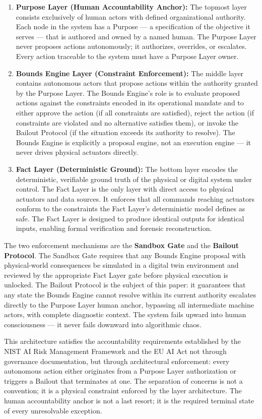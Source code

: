 \begin{enumerate}

\item \textbf{Purpose Layer (Human Accountability Anchor):} The topmost layer consists exclusively of human actors with defined organizational authority. Each node in the system has a Purpose --- a specification of the objective it serves --- that is authored and owned by a named human. The Purpose Layer never proposes actions autonomously; it authorizes, overrides, or escalates. Every action traceable to the system must have a Purpose Layer owner.

\item \textbf{Bounds Engine Layer (Constraint Enforcement):} The middle layer contains autonomous actors that propose actions within the authority granted by the Purpose Layer. The Bounds Engine's role is to evaluate proposed actions against the constraints encoded in its operational mandate and to either approve the action (if all constraints are satisfied), reject the action (if constraints are violated and no alternative satisfies them), or invoke the Bailout Protocol (if the situation exceeds its authority to resolve). The Bounds Engine is explicitly a proposal engine, not an execution engine --- it never drives physical actuators directly.

\item \textbf{Fact Layer (Deterministic Ground):} The bottom layer encodes the deterministic, verifiable ground truth of the physical or digital system under control. The Fact Layer is the only layer with direct access to physical actuators and data sources. It enforces that all commands reaching actuators conform to the constraints the Fact Layer's deterministic model defines as safe. The Fact Layer is designed to produce identical outputs for identical inputs, enabling formal verification and forensic reconstruction.

\end{enumerate}

The two enforcement mechanisms are the \textbf{Sandbox Gate} and the \textbf{Bailout Protocol}. The Sandbox Gate requires that any Bounds Engine proposal with physical-world consequences be simulated in a digital twin environment and reviewed by the appropriate Fact Layer gate before physical execution is unlocked. The Bailout Protocol is the subject of this paper: it guarantees that any state the Bounds Engine cannot resolve within its current authority escalates directly to the Purpose Layer human anchor, bypassing all intermediate machine actors, with complete diagnostic context. The system fails upward into human consciousness --- it never fails downward into algorithmic chaos.

This architecture satisfies the accountability requirements established by the NIST AI Risk Management Framework and the EU AI Act not through governance documentation, but through architectural enforcement: every autonomous action either originates from a Purpose Layer authorization or triggers a Bailout that terminates at one. The separation of concerns is not a convention; it is a physical constraint enforced by the layer architecture. The human accountability anchor is not a last resort; it is the required terminal state of every unresolvable exception.

